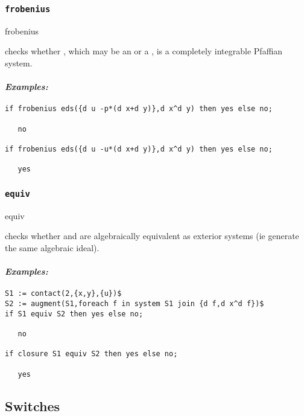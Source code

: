 \subsubsection{\tt frobenius}
\label{frobenius}

\begin{edssyntax}
	frobenius 
\end{edssyntax}
checks whether , which may be an  or a ,
is a completely integrable Pfaffian system.

\paragraph{\it Examples:}
\begin{verbatim}
if frobenius eds({d u -p*(d x+d y)},d x^d y) then yes else no;

   no

if frobenius eds({d u -u*(d x+d y)},d x^d y) then yes else no;

   yes
\end{verbatim}

\subsubsection{\tt equiv}
\label{equiv}

\begin{edssyntax}
	 equiv 
\end{edssyntax}
checks whether  and  are algebraically equivalent as
exterior systems (ie generate the same algebraic ideal).

\paragraph{\it Examples:}
\begin{verbatim}
S1 := contact(2,{x,y},{u})$
S2 := augment(S1,foreach f in system S1 join {d f,d x^d f})$
if S1 equiv S2 then yes else no;

   no 

if closure S1 equiv S2 then yes else no;

   yes 
\end{verbatim}




\subsection{Switches}
\label{Switches}


